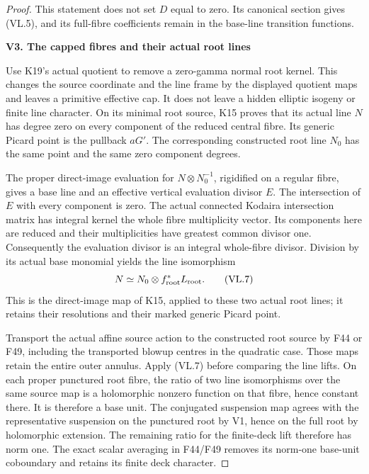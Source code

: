 \begin{proof}
This statement does not set \(D\) equal to zero. Its
canonical section gives (VL.5), and its full-fibre
coefficients remain in the base-line transition functions.

\par

\medskip\noindent\textbf{V3. The capped fibres and their actual root lines}

\par\nobreak

Use K19's actual quotient to remove a zero-gamma normal
root kernel. This changes the source coordinate and the
line frame by the displayed quotient maps and leaves a
primitive effective cap. It does not leave a hidden
elliptic isogeny or finite line character. On its minimal
root source, K15 proves that its actual line \(N\) has
degree zero on every component of the reduced central
fibre. Its generic Picard point is the pullback \(aG'\).
The corresponding constructed root line \(N_0\) has
the same point and the same zero component degrees.

The proper direct-image evaluation for
\(N\otimes N_0^{-1}\), rigidified on a regular fibre,
gives a base line and an effective vertical evaluation
divisor \(E\). The intersection of \(E\) with every
component is zero. The actual connected Kodaira
intersection matrix has integral kernel the whole
fibre multiplicity vector. Its components here are
reduced and their multiplicities have greatest common
divisor one. Consequently the evaluation divisor is
an integral whole-fibre divisor. Division by its
actual base monomial yields the line isomorphism
\[
             N\simeq N_0\otimes f_{\rm root}^*L_{\rm root}.
 \tag{VL.7}
\]
This is the direct-image map of K15, applied to these
two actual root lines; it retains their resolutions
and their marked generic Picard point.

Transport the actual affine source action to the
constructed root source by F44 or F49, including the
transported blowup centres in the quadratic case.
Those maps retain the entire outer annulus. Apply
(VL.7) before comparing the line lifts. On each
proper punctured root fibre, the ratio of two line
isomorphisms over the same source map is a
holomorphic nonzero function on that fibre, hence
constant there. It is therefore a base unit.
The conjugated suspension map agrees with the
representative suspension on the punctured root by
V1, hence on the full root by holomorphic extension.
The remaining ratio for the finite-deck lift
therefore has norm one.
The exact scalar averaging in F44/F49 removes its
norm-one base-unit coboundary and retains its finite
deck character.


\end{proof}
